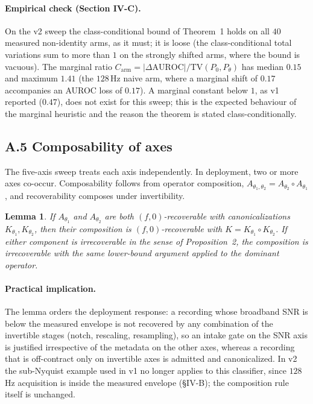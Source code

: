 \documentclass[conference]{IEEEtran}
\newtheorem{lemma}{Lemma}
\begin{document}
\paragraph{Empirical check (Section IV-C).} On the v2 sweep the
class-conditional bound of Theorem~1 holds on all $40$ measured
non-identity arms, as it must; it is loose (the class-conditional total
variations sum to more than $1$ on the strongly shifted arms, where the
bound is vacuous). The marginal ratio $C_{\mathrm{arm}} =
|\Delta\mathrm{AUROC}| / \mathrm{TV}(P_0,P_\theta)$ has median $0.15$
and maximum $1.41$ (the $128$\,Hz naive arm, where a marginal shift of
$0.17$ accompanies an AUROC loss of $0.17$). A marginal constant below
$1$, as v1 reported ($0.47$), does not exist for this sweep; this is the
expected behaviour of the marginal heuristic and the reason the theorem
is stated class-conditionally.

\subsection*{A.5 Composability of axes}
The five-axis sweep treats each axis independently. In deployment, two
or more axes co-occur. Composability follows from operator
composition, $A_{\theta_1, \theta_2} = A_{\theta_2} \circ A_{\theta_1}$,
and recoverability composes under invertibility.
\begin{lemma}\label{lem:compose}
If $A_{\theta_1}$ and $A_{\theta_2}$ are both $(f,0)$-recoverable with
canonicalizations $K_{\theta_1}, K_{\theta_2}$, then their composition
is $(f, 0)$-recoverable with $K = K_{\theta_1} \circ K_{\theta_2}$. If
either component is irrecoverable in the sense of Proposition~2, the
composition is irrecoverable with the same lower-bound argument applied
to the dominant operator.
\end{lemma}

\paragraph{Practical implication.} The lemma orders the deployment
response: a recording whose broadband SNR is below the measured
envelope is not recovered by any combination of the invertible stages
(notch, rescaling, resampling), so an intake gate on the SNR axis is
justified irrespective of the metadata on the other axes, whereas a
recording that is off-contract only on invertible axes is admitted and
canonicalized. In v2 the sub-Nyquist example used in v1 no longer
applies to this classifier, since $128$\,Hz acquisition is inside the
measured envelope (\S IV-B); the composition rule itself is unchanged.
\end{document}
